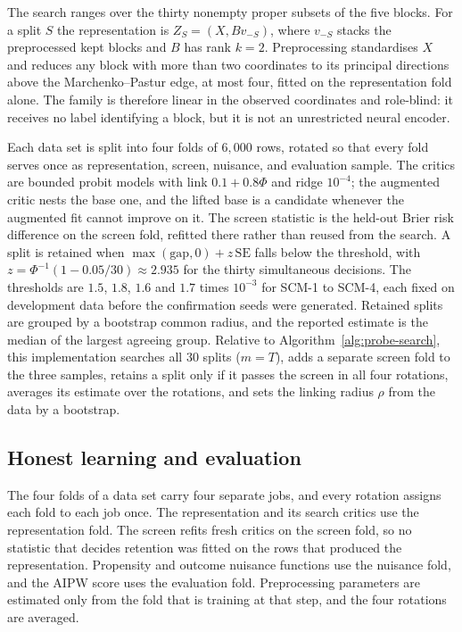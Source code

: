 The search ranges over the thirty nonempty proper subsets of the five blocks. For a split $S$ the representation is $Z_S=(X,Bv_{-S})$, where $v_{-S}$ stacks the preprocessed kept blocks and $B$ has rank $k=2$. Preprocessing standardises $X$ and reduces any block with more than two coordinates to its principal directions above the Marchenko--Pastur edge, at most four, fitted on the representation fold alone. The family is therefore linear in the observed coordinates and role-blind: it receives no label identifying a block, but it is not an unrestricted neural encoder.

Each data set is split into four folds of $6{,}000$ rows, rotated so that every fold serves once as representation, screen, nuisance, and evaluation sample. The critics are bounded probit models with link $0.1+0.8\Phi$ and ridge $10^{-4}$; the augmented critic nests the base one, and the lifted base is a candidate whenever the augmented fit cannot improve on it. The screen statistic is the held-out Brier risk difference on the screen fold, refitted there rather than reused from the search. A split is retained when $\max(\mathrm{gap},0)+z\,\mathrm{SE}$ falls below the threshold, with $z=\Phi^{-1}(1-0.05/30)\approx 2.935$ for the thirty simultaneous decisions. The thresholds are $1.5$, $1.8$, $1.6$ and $1.7$ times $10^{-3}$ for SCM-1 to SCM-4, each fixed on development data before the confirmation seeds were generated. Retained splits are grouped by a bootstrap common radius, and the reported estimate is the median of the largest agreeing group. Relative to Algorithm~\ref{alg:probe-search}, this implementation searches all $30$ splits ($m=T$), adds a separate screen fold to the three samples, retains a split only if it passes the screen in all four rotations, averages its estimate over the rotations, and sets the linking radius $\rho$ from the data by a bootstrap.

\subsection{Honest learning and evaluation}

The four folds of a data set carry four separate jobs, and every rotation assigns each fold to each job once. The representation and its search critics use the representation fold. The screen refits fresh critics on the screen fold, so no statistic that decides retention was fitted on the rows that produced the representation. Propensity and outcome nuisance functions use the nuisance fold, and the AIPW score uses the evaluation fold. Preprocessing parameters are estimated only from the fold that is training at that step, and the four rotations are averaged.

